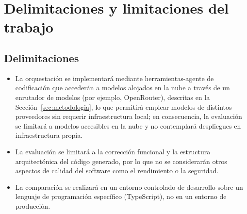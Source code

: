 \section{Delimitaciones y limitaciones del trabajo}
\label{sec:delimitaciones-limitaciones}


\subsection{Delimitaciones}
\begin{itemize}
  \item La orquestación se implementará mediante herramientas-agente de codificación que accederán a modelos alojados en la nube a través de un enrutador de modelos (por ejemplo, OpenRouter), descritas en la Sección~\ref{sec:metodologia}, lo que permitirá emplear modelos de distintos proveedores sin requerir infraestructura local; en consecuencia, la evaluación se limitará a modelos accesibles en la nube y no contemplará despliegues en infraestructura propia.
  \item La evaluación se limitará a la corrección funcional y la estructura arquitectónica del código generado, por lo que no se considerarán otros aspectos de calidad del software como el rendimiento o la seguridad.
  \item La comparación se realizará en un entorno controlado de desarrollo sobre un lenguaje de programación específico (TypeScript), no en un entorno de producción.
\end{itemize}

